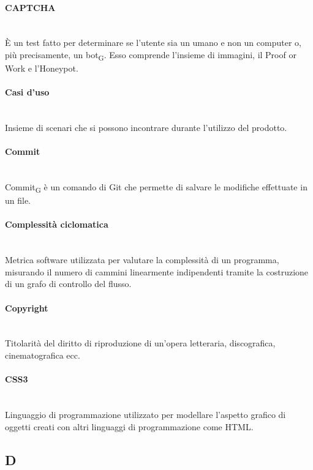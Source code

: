 \paragraph{CAPTCHA}~\smallskip \\
È un test fatto per determinare se l'utente sia un umano e non un computer o, più precisamente, un bot\textsubscript{G}.
Esso comprende l'insieme di immagini, il Proof or Work e l'Honeypot.

\paragraph{Casi d'uso}~\smallskip \\
Insieme di scenari che si possono incontrare durante l'utilizzo del prodotto.

\paragraph{Commit}~\smallskip \\
Commit\textsubscript{G} è un comando di Git che permette di salvare le modifiche effettuate in un file.

\paragraph{Complessità ciclomatica}~\smallskip \\
Metrica software utilizzata per valutare la complessità di un programma, misurando il numero di cammini linearmente indipendenti tramite la costruzione di un grafo di controllo del flusso.

\paragraph{Copyright}~\smallskip \\
Titolarità del diritto di riproduzione di un'opera letteraria, discografica, cinematografica ecc.

\paragraph{CSS3}~\smallskip \\
Linguaggio di programmazione utilizzato per modellare l'aspetto grafico di oggetti creati con altri linguaggi di programmazione come HTML.
\newpage
{}
\subsection*{D}

